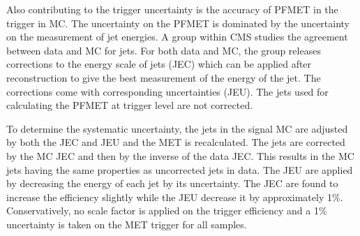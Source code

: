 

Also contributing to the trigger uncertainty is the accuracy of PFMET in the trigger in MC. The uncertainty on the PFMET is dominated by the uncertainty on
the measurement of jet energies. A group within CMS studies the agreement between data and MC for jets. For both data and MC,
the group releases corrections to the energy scale of jets (JEC) which can be applied after reconstruction to give the best measurement of the energy of the jet. The corrections
come with corresponding uncertainties (JEU). The jets used for calculating the PFMET at trigger level are not corrected.

To determine the systematic uncertainty, the jets in the signal MC are adjusted by both the JEC and JEU and the MET is recalculated.
The jets are corrected by the MC JEC and then by the inverse of the data JEC.
This results in the MC jets having the same properties as uncorrected jets in data.
The JEU are applied by decreasing the energy of each jet by its uncertainty.
The JEC are found to increase the efficiency slightly while the JEU decrease it by approximately 1\%.
Conservatively, no scale factor is applied on the trigger efficiency and a 1\% uncertainty is taken on the MET trigger for all samples.

